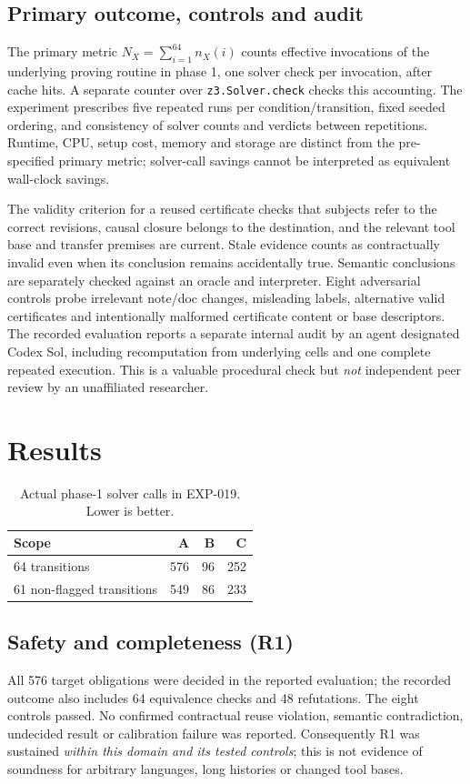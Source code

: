 \documentclass[10pt,twocolumn]{article}
\begin{document}
\subsection{Primary outcome, controls and audit}
The primary metric $N_X=\sum_{i=1}^{64}n_X(i)$ counts effective invocations of the underlying proving routine in phase 1, one solver check per invocation, after cache hits. A separate counter over \texttt{z3.Solver.check} checks this accounting. The experiment prescribes five repeated runs per condition/transition, fixed seeded ordering, and consistency of solver counts and verdicts between repetitions. Runtime, CPU, setup cost, memory and storage are distinct from the pre-specified primary metric; solver-call savings cannot be interpreted as equivalent wall-clock savings.

The validity criterion for a reused certificate checks that subjects refer to the correct revisions, causal closure belongs to the destination, and the relevant tool base and transfer premises are current. Stale evidence counts as contractually invalid even when its conclusion remains accidentally true. Semantic conclusions are separately checked against an oracle and interpreter. Eight adversarial controls probe irrelevant note/doc changes, misleading labels, alternative valid certificates and intentionally malformed certificate content or base descriptors. The recorded evaluation reports a separate internal audit by an agent designated Codex Sol, including recomputation from underlying cells and one complete repeated execution. This is a valuable procedural check but \emph{not} independent peer review by an unaffiliated researcher.

\section{Results}
\begin{table}[t]
\centering\caption{Actual phase-1 solver calls in EXP-019. Lower is better.}\label{tab:main}
\begin{tabular}{lrrr}\toprule
Scope & A & B & C\\\midrule
64 transitions & 576 & 96 & 252\\
61 non-flagged transitions & 549 & 86 & 233\\
\bottomrule\end{tabular}
\end{table}

\subsection{Safety and completeness (R1)}
All 576 target obligations were decided in the reported evaluation; the recorded outcome also includes 64 equivalence checks and 48 refutations. The eight controls passed. No confirmed contractual reuse violation, semantic contradiction, undecided result or calibration failure was reported. Consequently R1 was sustained \emph{within this domain and its tested controls}; this is not evidence of soundness for arbitrary languages, long histories or changed tool bases.
\end{document}
